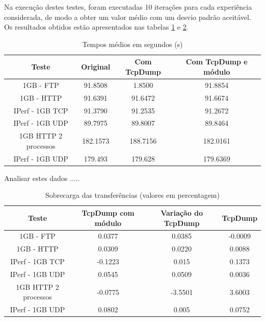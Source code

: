 \documentclass[a4paper]{llncs}
\begin{document}
Na execução destes testes, foram executadas 10 iterações para cada experiência considerada, de modo a obter um valor médio com um desvio padrão aceitável. Os resultados obtidos estão apresentados nas tabelas \ref{tab:desempenho} e \ref{tab:overhead}.

\begin{table}
\begin{center}

\begin{tabular}{ | c | c | c | c |  }
\hline
Teste & \hspace {0.3cm} Original \hspace {0.3cm}& \hspace {0.2cm} Com TcpDump \hspace {0.2cm} & Com TcpDump e módulo \\
\hline
1GB - FTP & 91.8508	& 1.8500 & 91.8854 \\
1GB - HTTP & 91.6391 & 91.6472 & 91.6674 \\ 
IPerf - 1GB TCP & 91.3790	& 91.2535	& 91.2672 \\
IPerf - 1GB UDP & 89.7975 & 89.8007 & 89.8464 \\
\hline
\hline
1GB HTTP 2 processos & 182.1573 & 188.7156 & 182.0161 \\
IPerf - 1GB UDP & 179.493 & 179.628 & 179.6369 \\
\hline
\end{tabular}
\caption{Tempos médios em segundos (s)}
\label{tab:desempenho}
\end{center}
\end{table}

Analisar estes dados .....

\begin{table}
\begin{center}

\begin{tabular}{ | c | c | c | c | }
\hline
Teste & TcpDump com módulo & Variação do TcpDump & \hspace {0.3cm} TcpDump \hspace {0.3cm}\\

\hline
1GB - FTP  & 0.0377 & 0.0385 & -0.0009 \\
1GB - HTTP &  0.0309 & 0.0220 & 0.0088 \\
IPerf - 1GB TCP &  -0.1223 & 0.015 & 0.1373 \\
IPerf - 1GB UDP & 0.0545 & 0.0509 & 0.0036 \\
\hline
\hline
1GB HTTP 2 processos & -0.0775 & -3.5501 & 3.6003 \\
IPerf - 1GB UDP & 0.0802 & 0.005 & 0.0752 \\
\hline
\end{tabular}
\caption{Sobrecarga das transferências (valores em percentagem)}
\label{tab:overhead}
\end{center}
\end{table}
\end{document}
